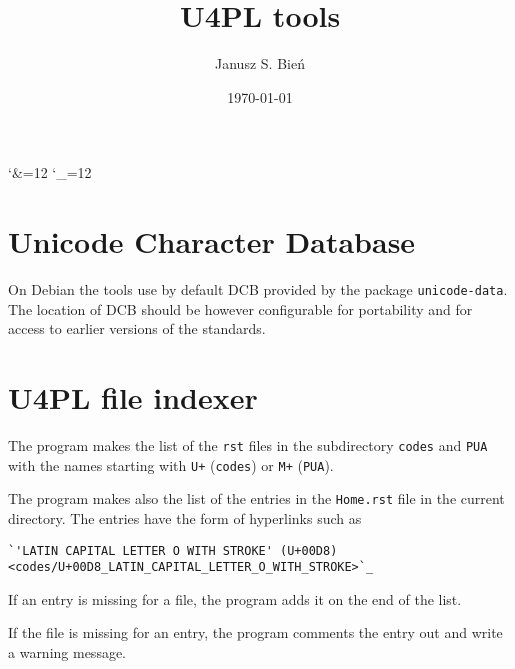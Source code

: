 \documentclass[12]{mwart}
\title{U4PL tools}
\author{Janusz S. Bień}
\date{\today}
\begin{document}
\maketitle

\catcode`\&=12
\catcode`\_=12

\section{Unicode Character Database}
\label{sec:unic-char-datab}

On Debian the tools use by default DCB provided by the package
\texttt{unicode-data}. The location of DCB should be however
configurable for portability and for access to earlier versions of the
standards.

\section{U4PL file indexer}
\label{sec:u4pl-file-indexer}

The program makes the list of the \texttt{rst} files in the
subdirectory \texttt{codes} and \texttt{PUA} with the names starting
with \texttt{U+} (\texttt{codes}) or \texttt{M+} (\texttt{PUA}).

The program makes also the list of the entries in the
\texttt{Home.rst} file in the current directory. The entries have the form
of hyperlinks such as

{
\begin{verbatim}
`'LATIN CAPITAL LETTER O WITH STROKE' (U+00D8) <codes/U+00D8_LATIN_CAPITAL_LETTER_O_WITH_STROKE>`_
\end{verbatim}
}

If an entry is missing for a file, the program adds it on the end of the list.

If the file is missing for an entry, the program comments the entry
out and write a warning message.
\end{document}
